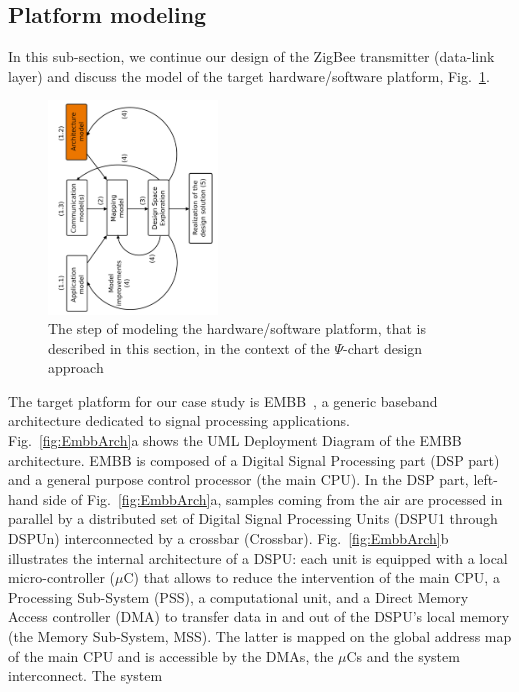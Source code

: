 \documentclass{llncs}
\begin{document}
\subsection{Platform modeling}
\label{subsec:Embb}
%
In this sub-section, we continue our design of the ZigBee transmitter (data-link layer) and discuss the model of the
target hardware/software platform, Fig.~\ref{fig:PsiChartArch}.\\
%
\begin{figure}[htbp]
	\centering
	\includegraphics[angle=-90,origin=c,width=0.4\textwidth]{figures/PsiChartArch.pdf}
	\caption{The step of modeling the hardware/software platform, that is described in this section, in the context of
        the $\Psi$-chart design approach}
	\label{fig:PsiChartArch}
\end{figure}
The target platform for our case study is EMBB~\cite{Embb}, a generic baseband architecture dedicated to signal
processing applications.\\
%
Fig.~\ref{fig:EmbbArch}a shows the UML Deployment Diagram of the EMBB architecture. EMBB is composed of a Digital Signal
Processing part (DSP part) and a general purpose control processor (the main CPU). In the DSP part, left-hand side of
Fig.~\ref{fig:EmbbArch}a, samples coming from the air are processed in parallel by a distributed set of Digital Signal
Processing Units (DSPU1 through DSPUn) interconnected by a crossbar (Crossbar). Fig.~\ref{fig:EmbbArch}b illustrates the
internal architecture of a DSPU: each unit is equipped with a local micro-controller ($\mu$C) that allows to reduce the
intervention of the main CPU, a Processing Sub-System (PSS), a computational unit, and a Direct Memory Access controller
(DMA) to transfer data in and out of the DSPU's local memory (the Memory Sub-System, MSS). The latter is mapped on the
global address map of the main CPU and is accessible by the DMAs, the $\mu$Cs and the system interconnect. The system
\end{document}
